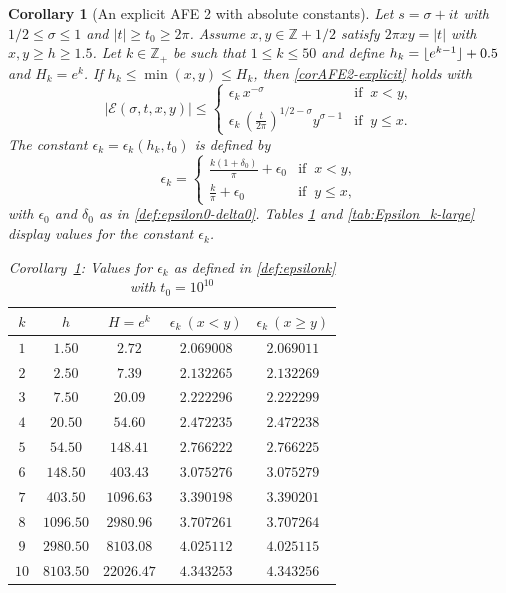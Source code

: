\documentclass[11pt,letterpaper,oneside,reqno]{amsart}
\DeclarePairedDelimiter\floor{\lfloor}{\rfloor}
\renewcommand{\^}[1]{\widehat{#1}}
\newcommand{\Z}{{\mathbb{Z}}}
\numberwithin{equation}{section}
\newtheorem{corollary}{Corollary}[theorem]
\theoremstyle{remark}
\newcommand*{\corref}[1]{Corollary~\ref{#1}}
\begin{document}
\begin{corollary}[An explicit AFE 2 with absolute constants] \label{cor-k-AFE2}
Let $s = \sigma + it$ with $1/2 \le \sigma \le 1$ and $|t| \ge t_0 \ge 
2\pi
$. Assume $x, y \in \mathbb{Z} + 1/2$ satisfy $2\pi xy = |t|$ with $x, y \ge h \ge 1.5$. Let $k\in\Z_+$ be such that $1\le k \le 50$ and define $h_k=\floor{e^{k-1}}+0.5$ and $H_k=e^{k}$.
If $h_k \le \min(x,y) \le H_k$, then
\eqref{corAFE2-explicit} holds with 
%
\begin{equation}
|\mathcal{E}(\sigma, t, x, y)| \le 
\begin{cases}
\epsilon_k \, x^{-\sigma}& \text{if }\  x<y , \\
\epsilon_k \, \left(\frac{t}{2\pi}\right)^{1/2 - \sigma} y^{\sigma - 1} & \text{if }\ y \le x .
\end{cases}
\end{equation}
The constant $\epsilon_k=\epsilon_k( h_k,t_0)$ is defined by
\begin{equation}\label{def:epsilonk}
\epsilon_k = 
\begin{cases}
\frac{k(1+\delta_0)}{\pi} +\epsilon_0 & \text{if }\  x < y , \\
\frac{k}{\pi} + \epsilon_0 & \text{if }\  y \le x ,
\end{cases}
\end{equation}
with $\epsilon_0$ and $\delta_0$ as in \eqref{def:epsilon0-delta0}.
Tables \ref{tab:Epsilon_k} and \ref{tab:Epsilon_k-large} display values for the constant $\epsilon_k$.
\begin{table}[H] 
\centering
\caption{\corref{cor-k-AFE2}: Values for $\epsilon_k$ as defined in \eqref{def:epsilonk} with $t_0 = 10^{10}$}
\label{tab:Epsilon_k}
\begin{tabular}{|c|c|c|c|c|}
\hline
$k$ & $h$ & $H = e^k$ & $\epsilon_k\ (x < y)$ & $\epsilon_k\ (x \ge y)$ \\
\hline
$1$  & $1.50$    & $2.72$     & $2.069008$ & $2.069011$ \\
$2$  & $2.50$    & $7.39$     & $2.132265$ & $2.132269$ \\
$3$  & $7.50$    & $20.09$    & $2.222296$ & $2.222299$ \\
$4$  & $20.50$   & $54.60$    & $2.472235$ & $2.472238$ \\
$5$  & $54.50$   & $148.41$   & $2.766222$ & $2.766225$ \\
$6$  & $148.50$  & $403.43$   & $3.075276$ & $3.075279$ \\
$7$  & $403.50$  & $1096.63$  & $3.390198$ & $3.390201$ \\
$8$  & $1096.50$ & $2980.96$  & $3.707261$ & $3.707264$ \\
$9$  & $2980.50$ & $8103.08$  & $4.025112$ & $4.025115$ \\ 
$10$ & $8103.50$ & $22026.47$ & $4.343253$ & $4.343256$ \\
\hline
\end{tabular}
\end{table}
\end{corollary}
\end{document}
